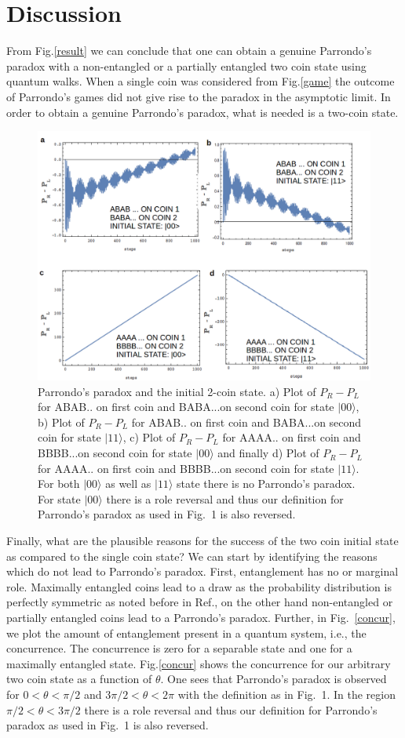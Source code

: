 \documentclass[english,aps,pra,amsmath,amssymb,showpacs,notitlepage,onecolumn]{revtex4-1}
\begin{document}
\section{Discussion}
From Fig.\ref{result} we can conclude that one can obtain a genuine Parrondo's paradox with a non-entangled or a partially entangled two coin state using  quantum walks. When a single coin was considered from Fig.\ref{game} the outcome of Parrondo's games did not give rise to the paradox in the asymptotic limit. In order to obtain a genuine Parrondo's paradox, what is needed is a two-coin state.  
\begin{figure}[h]
\centering 
\includegraphics[width=.793\textwidth]{00-11.png}
\caption{Parrondo's paradox and the initial 2-coin state. a) Plot of  $P_{R}-P_{L}$ for ABAB.. on first coin and BABA...on second coin for state $|00\rangle$, b) Plot of  $P_{R}-P_{L}$ for ABAB.. on first coin and BABA...on second coin for state $|11\rangle$, c) Plot of  $P_{R}-P_{L}$ for AAAA.. on first coin and BBBB...on second coin for state $|00\rangle$ and finally d) Plot of  $P_{R}-P_{L}$ for AAAA.. on first coin and BBBB...on second coin for state $|11\rangle$. For both $|00\rangle$ as well as $|11\rangle$ state there is no Parrondo's paradox. For state $|00\rangle$ there is a role reversal and thus our definition for Parrondo's paradox as used in Fig.~1 is also reversed. }
\label{initial-fig}
\end{figure}
Finally, what are the plausible reasons for the success of the two coin initial state as compared to the single coin state? We can start by identifying the reasons which do not lead to Parrondo's paradox. First, entanglement has no or marginal role.  Maximally entangled coins lead to a draw as the probability distribution is perfectly symmetric as noted before in Ref.\cite{entangled}, on the other hand non-entangled or partially entangled coins lead to a Parrondo's paradox. Further, in Fig.~\ref{concur}, we plot the amount of entanglement present in a quantum system, i.e., the concurrence\cite{concurrence}. The concurrence is zero for a separable state and one for a maximally entangled state. Fig.\ref{concur} shows the concurrence for our arbitrary two coin state as a function of $\theta$. One sees that Parrondo's paradox is observed for $0<\theta<\pi/2$ and $3\pi/2<\theta<2\pi$ with the definition as in Fig.~1. In the region $\pi/2 <\theta < 3\pi/2$ there is a role reversal and thus our definition for Parrondo's paradox as used in Fig.~1 is also reversed.
\end{document}
